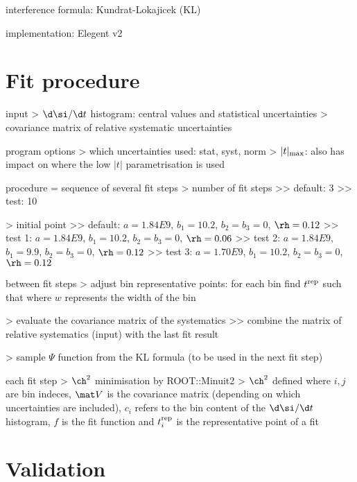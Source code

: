 \> interference formula: Kundrat-Lokajicek (KL)

\> implementation: Elegent v2


\chapter[fit]{Fit procedure}

\> input
\>> $\d\si/\d t$ histogram: central values and statistical uncertainties
\>> covariance matrix of relative systematic uncertainties

\> program options
\>> which uncertainties used: stat, syst, norm
\>> $|t|_{\rm max}$: also has impact on where the low $|t|$ parametrisation is used

\> procedure = sequence of several fit steps
\>> number of fit steps
\>>> default: 3
\>>> test: 10

\>> initial point
\>>> default: $a = 1.84E9$, $b_1 = 10.2$, $b_2 = b_3 = 0$, $\rh = 0.12$
\>>> test 1: $a = 1.84E9$, $b_1 = 10.2$, $b_2 = b_3 = 0$, $\rh = 0.06$
\>>> test 2: $a = 1.84E9$, $b_1 = 9.9$, $b_2 = b_3 = 0$, $\rh = 0.12$
\>>> test 3: $a = 1.70E9$, $b_1 = 10.2$, $b_2 = b_3 = 0$, $\rh = 0.12$

\> between fit steps
\>> adjust bin representative points: for each bin find $t^{\rm rep}$ such that
where $w$ represents the width of the bin

\>> evaluate the covariance matrix of the systematics
\>>> combine the matrix of relative systematics (input) with the last fit result

\>> sample $\Psi$ function from the KL formula (to be used in the next fit step)

\> each fit step
\>> $\ch^2$ minimisation by ROOT::Minuit2
\>> $\ch^2$ defined
where $i,j$ are bin indeces, $\mat V$ is the covariance matrix (depending on which uncertainties are included), $c_i$ refers to the bin content of the $\d\si/\d t$ histogram, $f$ is the fit function and $t^{\rm rep}_i$ is the representative point of a fit

%


\chapter{Validation}


